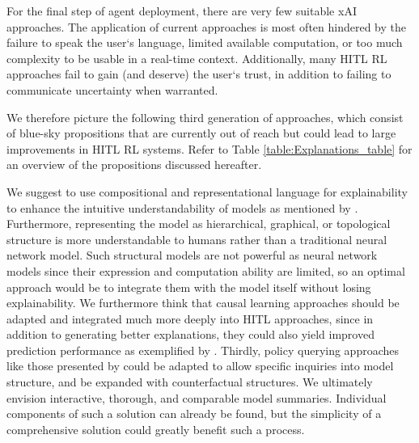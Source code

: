 \documentclass[twoside,11pt]{article}
\begin{document}
For the final step of agent deployment, there are very few suitable xAI approaches. The application of current approaches is most often hindered by the failure to speak the user`s language, limited available computation, or too much complexity to be usable in a real-time context. Additionally, many HITL RL approaches fail to gain (and deserve) the user`s trust, in addition to failing to communicate uncertainty when warranted.

We therefore picture the following third generation of approaches, which consist of blue-sky propositions that are currently out of reach but could lead to large improvements in HITL RL systems. Refer to Table \ref{table:Explanations_table} for an overview of the propositions discussed hereafter.


We suggest to use compositional and representational language for explainability to enhance the intuitive understandability of models as mentioned by \citet{RoyEtAl:2021:RLRoboticsChallenges}.
Furthermore, representing the model as hierarchical, graphical, or topological structure \citep{lyu2019sdrl,battaglia2018relational} is more understandable to humans rather than a traditional neural network model. Such structural models are not powerful as neural network models since their expression and computation ability are limited, so an optimal approach would be to integrate them with the model itself without losing explainability.
We furthermore think that causal learning approaches should be adapted and integrated much more deeply into HITL approaches, since in addition to generating better explanations, they could also yield improved prediction performance as exemplified by \citet{MadumalEtAl:2020:CausalRLCFs}. Thirdly, policy querying approaches like those presented by \citet{HayesShah:2017:AutonomousPolicyExplanation} could be adapted to allow specific inquiries into model structure, and be expanded with counterfactual structures.
We ultimately envision interactive, thorough, and comparable model summaries. Individual components of such a solution can already be found, but the simplicity of a comprehensive solution could greatly benefit such a process.


\end{document}
